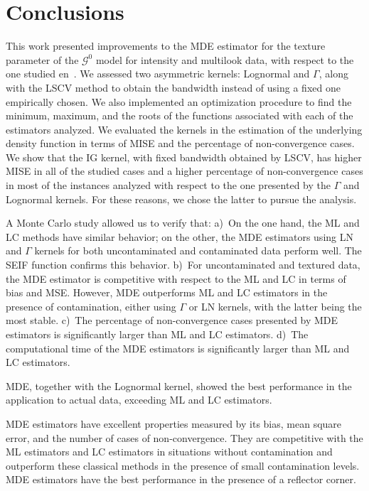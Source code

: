 \documentclass[twocolumn]{svjour3}
\begin{document}
\section{Conclusions}
\label{conclusion}

This work presented improvements to the MDE estimator for the texture parameter of the $\mathcal{G}^0$ model for intensity and multilook data, with respect to the one studied en~\cite{gambini2015}. 
We assessed two asymmetric kernels: Lognormal and $\Gamma$, along with the LSCV method to obtain the bandwidth instead of using a fixed one empirically chosen.
We also implemented an optimization procedure to find the minimum, maximum, and the roots of the functions associated with each of the estimators analyzed.
We evaluated the kernels in the estimation of the underlying density function in terms of MISE and the percentage of non-convergence cases. 
We show that the IG kernel, with fixed bandwidth obtained by LSCV, has higher MISE in all of the studied cases and a higher percentage of non-convergence cases in most of the instances analyzed with respect to the one presented by the $\Gamma$ and Lognormal kernels. 
For these reasons, we chose the latter to pursue the analysis.

A Monte Carlo study allowed us to verify that:
a)~On the one hand, the ML and LC methods have similar behavior; on the other, the MDE estimators using LN and $\Gamma$ kernels for both uncontaminated and contaminated data perform well. 
The SEIF function confirms this behavior.
b)~For uncontaminated and textured data, the MDE estimator is competitive with respect to the ML and LC in terms of bias and MSE. 
However, MDE outperforms ML and LC estimators in the presence of contamination, either using $\Gamma$ or LN kernels, with the latter being the most stable.
c)~The percentage of non-convergence cases presented by MDE estimators is significantly larger than ML and LC estimators.
d)~The computational time of the MDE estimators is significantly larger than ML and LC estimators.

MDE, together with the Lognormal kernel, showed the best performance in the application to actual data, exceeding ML and LC estimators. 

MDE estimators have excellent properties measured by its bias, mean square error, and the number of cases of non-convergence. 
They are competitive with the ML estimators and LC estimators in situations without contamination and outperform these classical methods in the presence of small contamination levels. 
MDE estimators have the best performance in the presence of a reflector corner.
\end{document}
